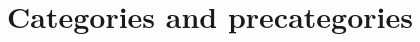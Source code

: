 \documentclass[hott-all.tex]{subfiles}
\begin{document}
%
%
%

\section{Categories and precategories}
\label{sec:cats}

\end{document}
